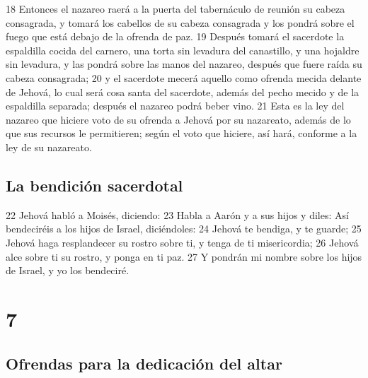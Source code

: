 18 Entonces el nazareo raerá a la puerta del tabernáculo de reunión su cabeza consagrada, y tomará los cabellos de su cabeza consagrada y los pondrá sobre el fuego que está debajo de la ofrenda de paz.
19 Después tomará el sacerdote la espaldilla cocida del carnero, una torta sin levadura del canastillo, y una hojaldre sin levadura, y las pondrá sobre las manos del nazareo, después que fuere raída su cabeza consagrada;
20 y el sacerdote mecerá aquello como ofrenda mecida delante de Jehová, lo cual será cosa santa del sacerdote, además del pecho mecido y de la espaldilla separada; después el nazareo podrá beber vino.
21 Esta es la ley del nazareo que hiciere voto de su ofrenda a Jehová por su nazareato, además de lo que sus recursos le permitieren; según el voto que hiciere, así hará, conforme a la ley de su nazareato.
\section*{La bendición sacerdotal}

22 Jehová habló a Moisés, diciendo:
23 Habla a Aarón y a sus hijos y diles: Así bendeciréis a los hijos de Israel, diciéndoles: 
24 Jehová te bendiga, y te guarde; 
25 Jehová haga resplandecer su rostro sobre ti, y tenga de ti misericordia; 
26 Jehová alce sobre ti su rostro, y ponga en ti paz. 
27 Y pondrán mi nombre sobre los hijos de Israel, y yo los bendeciré. 

\chapter{7}

\section*{Ofrendas para la dedicación del altar }


